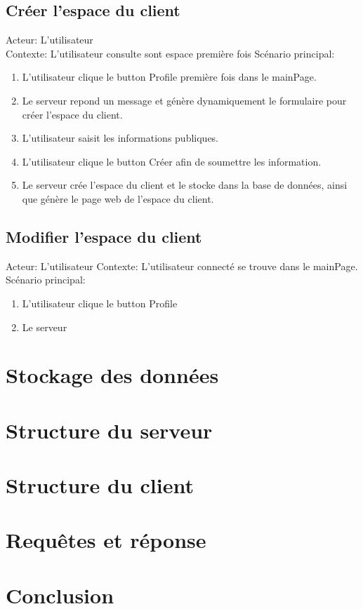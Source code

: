 \documentclass[14px]{article}
\begin{document}
\subsection{Créer l'espace du client}
Acteur: L'utilisateur\\
Contexte: L'utilisateur consulte sont espace première fois
Scénario principal:
\begin{enumerate}
	\item L'utilisateur clique le button Profile première fois dans le mainPage.
	\item Le serveur repond un message et génère dynamiquement le formulaire pour créer l'espace du client.
	\item L'utilisateur saisit les informations publiques.
	\item L'utilisateur clique le button Créer afin de soumettre les information.
	\item Le serveur crée l'espace du client et le stocke dans la base de données, ainsi que génère le page web de l'espace du client.
\end{enumerate}

\subsection{Modifier l'espace du client}
Acteur: L'utilisateur
Contexte: L'utilisateur connecté se trouve dans le mainPage.
Scénario principal:
\begin{enumerate}
	\item L'utilisateur clique le button Profile
	\item Le serveur 
\end{enumerate}




\section{Stockage des données}

\section{Structure du serveur}

\section{Structure du client}

\section{Requêtes et réponse}

\section{Conclusion}

	
\end{document}
